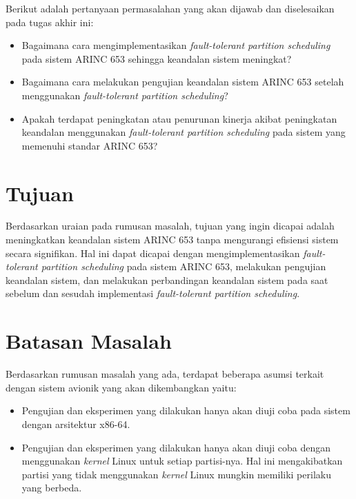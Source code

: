 Berikut adalah pertanyaan permasalahan yang akan dijawab dan diselesaikan pada tugas akhir ini:

\begin{itemize}

    \item Bagaimana cara mengimplementasikan \textit{fault-tolerant partition scheduling} pada
    	    sistem ARINC 653 sehingga keandalan sistem meningkat?

    \item Bagaimana cara melakukan pengujian keandalan sistem ARINC 653 setelah menggunakan
    	    \textit{fault-tolerant partition scheduling}?

    \item Apakah terdapat peningkatan atau penurunan kinerja akibat peningkatan keandalan
    	    menggunakan \textit{fault-tolerant partition scheduling} pada sistem yang memenuhi
    	    standar ARINC 653?

\end{itemize}

\section{Tujuan}
\label{section:tujuan}

Berdasarkan uraian pada rumusan masalah, tujuan yang ingin dicapai adalah meningkatkan keandalan
sistem ARINC 653 tanpa mengurangi efisiensi sistem secara signifikan. Hal ini dapat dicapai
dengan mengimplementasikan \textit{fault-tolerant partition scheduling} pada sistem ARINC 653,
melakukan pengujian keandalan sistem, dan melakukan perbandingan keandalan sistem pada saat
sebelum dan sesudah implementasi \textit{fault-tolerant partition scheduling}.

\section{Batasan Masalah}
\label{section:batasan_masalah}

Berdasarkan rumusan masalah yang ada, terdapat beberapa asumsi terkait dengan sistem avionik
yang akan dikembangkan yaitu:

\begin{itemize}

    \item Pengujian dan eksperimen yang dilakukan hanya akan diuji coba pada sistem dengan
    	    arsitektur x86-64.

    \item Pengujian dan eksperimen yang dilakukan hanya akan diuji coba dengan menggunakan
    	    \textit{kernel} Linux untuk setiap partisi-nya.  Hal ini mengakibatkan partisi yang
    	    tidak menggunakan \textit{kernel} Linux mungkin memiliki perilaku yang berbeda.

\end{itemize}

